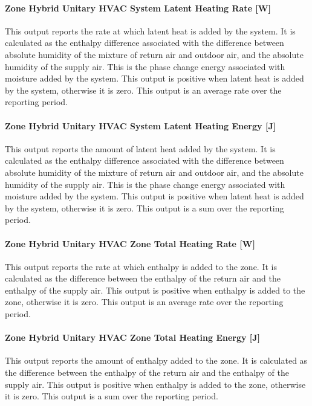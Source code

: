 \paragraph{Zone Hybrid Unitary HVAC System Latent Heating Rate [W]}
This output reports the rate at which latent heat is added by the system.  It is calculated as the enthalpy difference associated with the difference between absolute humidity of the mixture of return air and outdoor air, and the absolute humidity of the supply air. This is the phase change energy associated with moisture added by the system. This output is positive when latent heat is added by the system, otherwise it is zero.  This output is an average rate over the reporting period.

\paragraph{Zone Hybrid Unitary HVAC System Latent Heating Energy [J]}
This output reports the amount of latent heat added by the system.  It is calculated as the enthalpy difference associated with the difference between absolute humidity of the mixture of return air and outdoor air, and the absolute humidity of the supply air.  This is the phase change energy associated with moisture added by the system. This output is positive when latent heat is added by the system, otherwise it is zero. This output is a sum over the reporting period.

\paragraph{Zone Hybrid Unitary HVAC Zone Total Heating Rate [W]}
This output reports the rate at which enthalpy is added to the zone. It is calculated as the difference between the enthalpy of the return air and the enthalpy of the supply air. This output is positive when enthalpy is added to the zone, otherwise it is zero. This output is an  average rate over the reporting period.

\paragraph{Zone Hybrid Unitary HVAC Zone Total Heating Energy [J]}
This output reports the amount of enthalpy added to the zone. It is calculated as the difference between the enthalpy of the return air and the enthalpy of the supply air. This output is positive when enthalpy is added to the zone, otherwise it is zero. This output is a sum over the reporting period.

